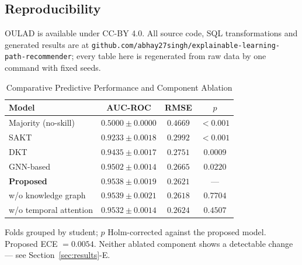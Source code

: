 \subsection*{Reproducibility}

OULAD is available under CC-BY 4.0. All source code, SQL transformations and generated
results are at \texttt{github.com/abhay27singh/\allowbreak explainable-learning-path-recommender};
every table here is regenerated from raw data by one command with fixed seeds.


\begin{table}[t]
\centering
\caption{Comparative Predictive Performance and Component Ablation}
\label{tab:accuracy}
\setlength{\tabcolsep}{3pt}\footnotesize
\begin{tabular}{lccc}
\hline
\textbf{Model} & \textbf{AUC-ROC} & \textbf{RMSE} & \textbf{$p$} \\
\hline
Majority (no-skill) & $0.5000 \pm 0.0000$ & $0.4669$ & $<0.001$ \\
SAKT                & $0.9233 \pm 0.0018$ & $0.2992$ & $<0.001$ \\
DKT                 & $0.9435 \pm 0.0017$ & $0.2751$ & $0.0009$ \\
GNN-based           & $0.9502 \pm 0.0014$ & $0.2665$ & $0.0220$ \\
\textbf{Proposed}   & $\mathbf{0.9538 \pm 0.0019}$ & $\mathbf{0.2621}$ & --- \\
\hline
\quad w/o knowledge graph    & $0.9539 \pm 0.0021$ & $0.2618$ & $0.7704$ \\
\quad w/o temporal attention & $0.9532 \pm 0.0014$ & $0.2624$ & $0.4507$ \\
\hline
\end{tabular}

\vspace{2pt}
{\footnotesize Folds grouped by student; $p$ Holm-corrected against the proposed model.
Proposed ECE $=0.0054$. Neither ablated component shows a detectable change --- see
Section~\ref{sec:results}-E.}
\end{table}

